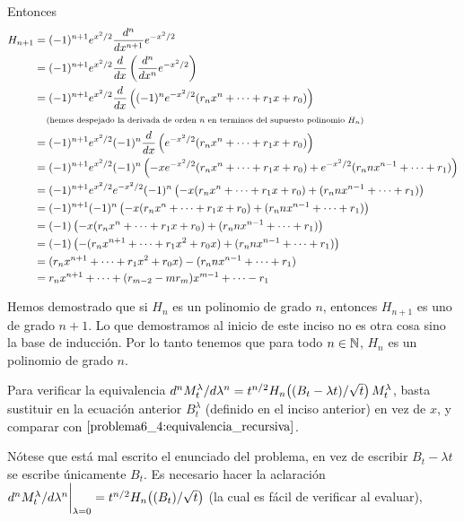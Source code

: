 Entonces
\scriptsize
\begin{align}
    H_{n+1} &=  (-1)^{n+1}  e^{x^2/2}   \frac{d^n}{dx^{n+1}}e^{-x^2/2}                                                                              \\
            &=  (-1)^{n+1}  e^{x^2/2}   \frac{d}{dx}\left(\frac{d^n}{dx^{n}}e^{-x^2/2}\right)                                                       \\
            &=  (-1)^{n+1}  e^{x^2/2}   \frac{d}{dx}\left((-1)^n e^{-x^2/2}(r_n x^n + \dots + r_1 x + r_0)\right)                                   \\
            &\;\;\;\;\mbox{{\scriptsize(hemos despejado la derivada de orden $n$ en terminos del supuesto polinomio $H_n$)}}                                            \\
            &=  (-1)^{n+1}  e^{x^2/2} (-1)^n \frac{d}{dx}\left(e^{-x^2/2}(r_n x^n + \dots + r_1 x + r_0)\right)                                     \\
            &=  (-1)^{n+1}  e^{x^2/2} (-1)^n \left(-x e^{-x^2/2}(r_n x^n + \dots + r_1 x + r_0) + e^{-x^2/2}(r_n n x^{n-1} + \dots + r_1)\right)    \\
            &=  (-1)^{n+1}  e^{x^2/2} e^{-x^2/2} (-1)^n \left(-x (r_n x^n + \dots + r_1 x + r_0) + (r_n n x^{n-1} + \dots + r_1)\right)             \\
            &=  (-1)^{n+1} (-1)^n \left(-x (r_n x^n + \dots + r_1 x + r_0) + (r_n n x^{n-1} + \dots + r_1)\right)                                   \\
            &=  (-1) \left(-x (r_n x^n + \dots + r_1 x + r_0) + (r_n n x^{n-1} + \dots + r_1)\right)                                                \\
            &=  (-1) \left(-(r_n x^{n+1} + \dots + r_1 x^2 + r_0 x) + (r_n n x^{n-1} + \dots + r_1)\right)                                          \\
            &=  (r_n x^{n+1} + \dots + r_1 x^2 + r_0 x) - (r_n n x^{n-1} + \dots + r_1)                                                             \\
            &=  r_n x^{n+1} + \dots + (r_{m-2} - m r_m) x^{m-1} + \dots - r_1                                                                       \\
\end{align}
\normalsize

Hemos demostrado que si $H_n$ es un polinomio de grado $n$, entonces $H_{n+1}$ es 
uno de grado $n+1$. Lo que demostramos al inicio de este inciso no es otra 
cosa sino la base de inducción. Por lo tanto tenemos que para todo $n \in \mathbb{N}$, 
$H_n$ es un polinomio de grado $n$.\pn

Para verificar la equivalencia $d^n M^\lambda_t/d \lambda^n=t^{n/2}H_n\!\left( (B_t - \lambda t)/\sqrt{t}\right) M^\lambda_t$, basta sustituir en la ecuación anterior
$B_t^\lambda$ (definido en el inciso anterior) en vez de $x$, y comparar con $\eqref{problema6_4:equivalencia_recursiva}$.\pn 

Nótese que está mal escrito el enunciado del problema, en vez de escribir $B_t - \lambda t$ se escribe únicamente $B_t$. Es necesario hacer la aclaración
$d^n M^\lambda_t/d \lambda^n \bigg|_{\lambda = 0}=t^{n/2}H_n\!\left( (B_t)/\sqrt{t}\right) $ (la cual es fácil de verificar al evaluar), 
